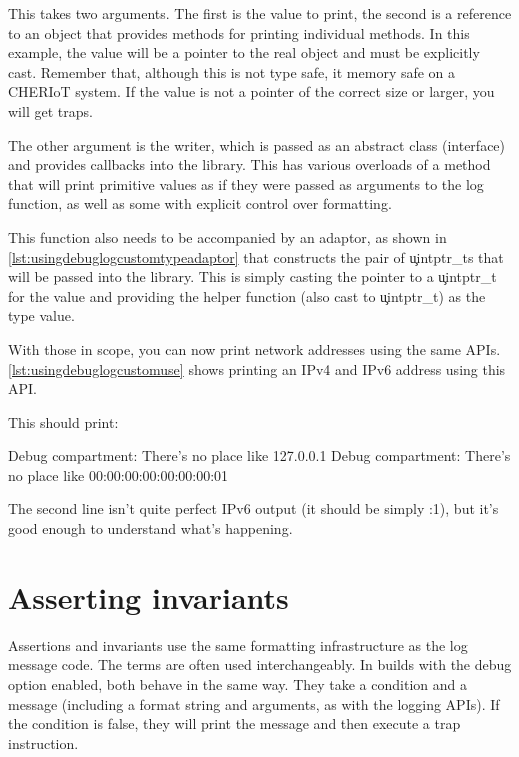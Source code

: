 {This takes two arguments.
The first is the value to print, the second is a reference to an object that provides methods for printing individual methods.
In this example, the value will be a pointer to the real object and must be explicitly cast.
Remember that, although this is not type safe, it  memory safe on a CHERIoT system.
If the value is not a pointer of the correct size or larger, you will get traps.

The other argument is the writer, which is passed as an abstract class (interface) and provides callbacks into the  library.
This has various overloads of a  method that will print primitive values as if they were passed as arguments to the log function, as well as some with explicit control over formatting.

This function also needs to be accompanied by an adaptor, as shown in \ref{lst:usingdebuglogcustomtypeadaptor} that constructs the pair of \c{uintptr_t}s that will be passed into the library.
This is simply casting the pointer to a \c{uintptr_t} for the value and providing the helper function (also cast to \c{uintptr_t}) as the type value.

\codelisting[filename=examples/debug_helpers/example.cc,marker=type_adaptor,label=lst:usingdebuglogcustomtypeadaptor,caption="Defining an adaptor for a custom type."]{}

With those in scope, you can now print network addresses using the same APIs.
\ref{lst:usingdebuglogcustomuse} shows printing an IPv4 and IPv6 address using this API.

\codelisting[filename=examples/debug_helpers/example.cc,marker=custom_log,label=lst:usingdebuglogcustomuse,caption="Printing a custom type with the debug APIs."]{}

This should print:

\begin{console}
Debug compartment: There's no place like 127.0.0.1
Debug compartment: There's no place like 00:00:00:00:00:00:00:01
\end{console}

The second line isn't quite perfect IPv6 output (it should be simply :1), but it's good enough to understand what's happening.

\section{Asserting invariants}

Assertions and invariants use the same formatting infrastructure as the log message code.
The terms are often used interchangeably.
In builds with the debug option enabled, both behave in the same way.
They take a condition and a message (including a format string and arguments, as with the logging APIs).
If the condition is false, they will print the message and then execute a trap instruction.

}
